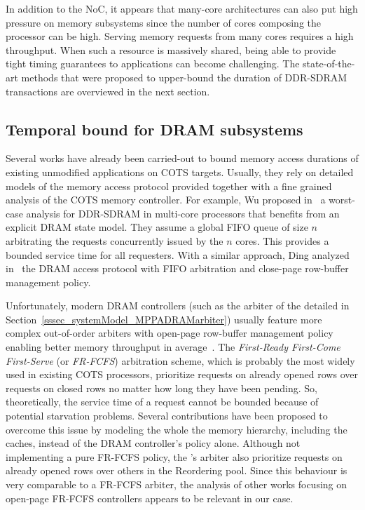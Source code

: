 \documentclass[main.tex]{subfiles}
\begin{document}
In addition to the NoC, it appears that many-core architectures can also put
high pressure on memory subsystems since the number of cores composing the
processor can be high. Serving memory requests from many cores requires a high
throughput. When such a resource is massively shared, being able to provide
tight timing guarantees to applications can become challenging. The
state-of-the-art methods that were proposed to upper-bound the duration of
DDR-SDRAM transactions are overviewed in the next section.  



\subsection{Temporal bound for DRAM subsystems}
Several works have already been carried-out to bound memory access durations of
existing unmodified applications on COTS targets. Usually, they rely on
detailed models of the memory access protocol provided together with a fine
grained analysis of the COTS memory controller. For example, Wu \etal proposed
in~\cite{Wu2013} a worst-case analysis for DDR-SDRAM in multi-core processors
that benefits from an explicit DRAM state model. They assume a global FIFO
queue of size $n$ arbitrating the requests concurrently issued by the $n$
cores. This provides a bounded service time for all requesters. With a similar
approach, Ding \etal analyzed in~\cite{ding2013} the DRAM access protocol with
FIFO arbitration and close-page row-buffer management policy. 

Unfortunately, modern DRAM controllers (such as the arbiter of the \mppalong
detailed in Section~\ref{sssec_systemModel_MPPADRAMarbiter}) usually feature
more complex out-of-order arbiters with open-page row-buffer management policy
enabling better memory throughput in average~\cite{Rixner2000}. The
\emph{First-Ready First-Come First-Serve} (or \emph{FR-FCFS}) arbitration
scheme, which is probably the most widely used in existing COTS processors,
prioritize requests on already opened rows over requests on closed rows no
matter how long they have been pending. So, theoretically, the service time of
a request cannot be bounded because of potential starvation problems. Several
contributions have been proposed to overcome this issue by modeling the whole
the memory hierarchy, including the caches, instead of the DRAM controller's
policy alone. Although not implementing a pure FR-FCFS policy, the \mppalong's
arbiter also prioritize requests on already opened rows over others in the
Reordering pool. Since this behaviour is very comparable to a FR-FCFS arbiter,
the analysis of other works focusing on open-page FR-FCFS controllers appears
to be relevant in our case.\\
\end{document}
